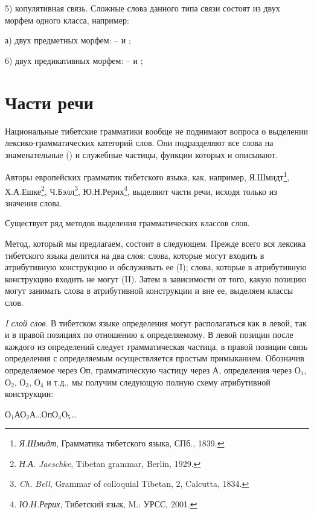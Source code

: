 5) копулятивная связь. Сложные слова данного типа связи состоят из двух морфем одного класса, например:

а) двух предметных морфем:  --  и ;

6)	двух предикативных морфем:  --  и ;

\section{Части речи}

Национальные тибетские грамматики вообще не поднимают вопроса о выделении лексико-грамматических категорий слов. Они подразделяют все слова на знаменательные () и служебные частицы, функции которых и описывают.

Авторы европейских грамматик тибетского языка, как, например,
Я.Шмидт\footnote[20]{\emph{Я.Шмидт}, Грамматика тибетского языка, СПб., 1839.},
Х.А.Ешке\footnote[21]{\emph{Н.А. Jaeschke}, Tibetan grammar, Berlin, 1929.},
Ч.Бэлл\footnote[22]{\emph{Ch. Bell}, Grammar of colloquial Tibetan, 2, Calcutta, 1834.},
Ю.Н.Рерих\footnote[23]{\emph{Ю.Н.Рерих}, Тибетский язык, M.: УРСС, 2001.},
выделяют части речи, исходя только из значения слова.

Существует ряд методов выделения грамматических классов слов.

Метод, который мы предлагаем, состоит в следующем. Прежде всего вся лексика тибетского языка делится на два слоя: слова, которые могут входить в атрибутивную конструкцию и обслуживать ее (I); слова, которые в атрибутивную конструкцию входить не могут (II). Затем в зависимости от того, какую позицию могут занимать слова в атрибутивной конструкции и вне ее, выделяем классы слов.

\emph{I слой слов}. В тибетском языке определения могут располагаться как в левой, так и в правой позициях по отношению к определяемому. В левой позиции после каждого из определений следует грамматическая частица, в правой позиции связь определения с определяемым осуществляется простым примыканием. Обозначив определяемое через Оп, грамматическую частицу через А, определения через О$_{1}$, О$_{2}$, О$_{3}$, О$_{4}$ и т.д., мы получим следующую полную схему атрибутивной конструкции:
\begin{center}
    О$_{1}$АО$_{2}$А\dots ОпО$_{4}$О$_{5}$\dots
\end{center}

